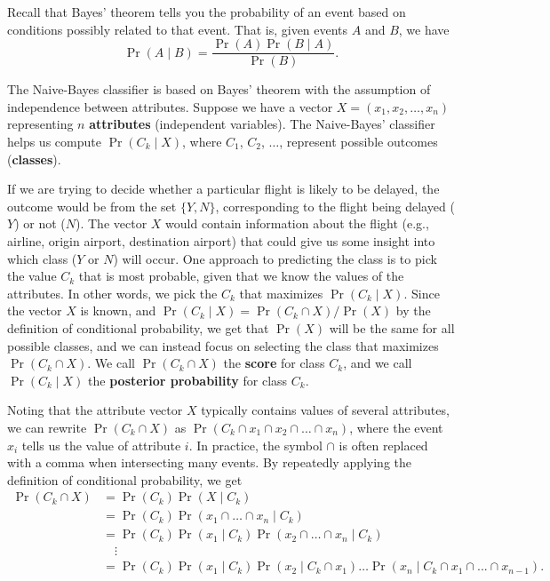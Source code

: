 \documentclass[11pt]{article}
\begin{document}
Recall that Bayes' theorem tells you the probability of an event based on
conditions possibly related to that event. That is, given events $A$ and $B$, we have
\begin{equation}
\Pr(A \mid B) = \frac{\Pr(A)\Pr(B \mid A)}{\Pr(B)}.
\end{equation}

The Naive-Bayes classifier is based on Bayes' theorem with the assumption of independence between attributes.
Suppose we have a vector $X = (x_1, x_2, \ldots, x_n)$ representing $n$ \textbf{attributes}
(independent variables). The Naive-Bayes' classifier helps us compute $\Pr(C_k \mid X)$,
where $C_1$, $C_2$, $\ldots$, represent possible outcomes (\textbf{classes}).

If we are trying to decide whether a particular flight is likely to be delayed,
the outcome would be from the set $\{Y, N\}$, corresponding to the
flight being delayed ($Y$) or not ($N$).
The vector $X$ would contain information about the flight
(e.g., airline, origin airport, destination airport)
that could give us some insight into which class ($Y$ or $N$) will occur.
One approach to predicting the class is to pick the value $C_k$ that is most probable,
given that we know the values of the attributes.
In other words, we pick the $C_k$ that maximizes $\Pr(C_k \mid X)$.
Since the vector $X$ is known, and $\Pr(C_k \mid X) = \Pr(C_k \cap X)/\Pr(X)$
by the definition of conditional probability,
we get that $\Pr(X)$ will be the same for all possible classes,
and we can instead focus on selecting the class that maximizes $\Pr(C_k \cap X)$.
We call $\Pr(C_k \cap X)$ the \textbf{score} for class $C_k$,
and we call $\Pr(C_k \mid X)$ the \textbf{posterior probability} for class $C_k$.

Noting that the attribute vector $X$ typically contains values of several attributes,
we can rewrite $\Pr(C_k \cap X)$ as $\Pr(C_k \cap x_1 \cap x_2 \cap \ldots \cap x_n)$,
where the event $x_i$ tells us the value of attribute $i$.
In practice, the symbol $\cap$ is often replaced with a comma when intersecting many events.
By repeatedly applying the definition of conditional probability, we get
\begin{align}
\Pr(C_k \cap X) &= \Pr(C_k)\Pr(X \mid C_k) \nonumber
\\ &= \Pr(C_k)\Pr(x_1 \cap \ldots \cap x_n \mid C_k) \nonumber
\\ &= \Pr(C_k)\Pr(x_1 \mid C_k)\Pr(x_2 \cap \ldots \cap x_n \mid C_k) \nonumber
\\ &\quad\vdots \nonumber
\\ &= \Pr(C_k)\Pr(x_1 \mid C_k)\Pr(x_2 \mid C_k \cap x_1)
    \ldots\Pr(x_n \mid C_k \cap x_1 \cap ... \cap x_{n-1}).
    \label{eq:prob-prod}
\end{align}
\end{document}
